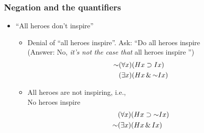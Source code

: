 \begin{frame}
    \frametitle{Negation and the quantifiers}

\begin{itemize}[<+->]
\item ``All heroes don't inspire''
\begin{itemize}[<+->]
\item Denial of ``all heroes inspire''. Ask: ``Do all heroes inspire\\
(Answer: No, \textit{it's not the case that} all heroes inspire '')\pauses %
\begin{align*}
\lnot\qt{\forall}{x}(H\qv{x} & {} \to I\qv{x}) \\
\qt{\exists}{x}(H\qv{x} & {} \land\lnot I\qv{x})
\end{align*}
\item All heroes are not inspiring, i.e.,\\
No heroes inspire\pauses
\begin{align*}
\qt{\forall}{x}(H\qv{x} & {} \to \lnot I\qv{x}) \\
\lnot\qt{\exists}{x}(H\qv{x} & {}\land I\qv{x})
\end{align*}
\end{itemize}
\end{itemize}
\end{frame}

